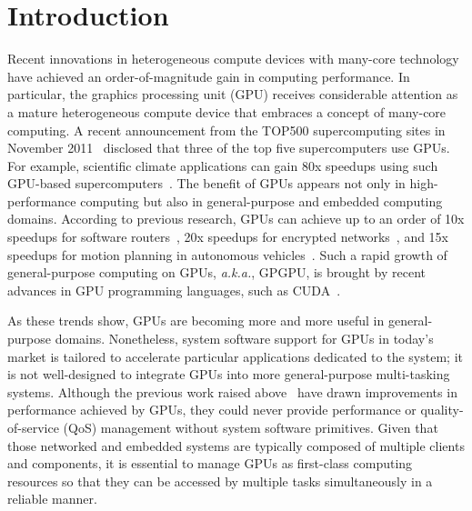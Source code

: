 \vspace{-0.25em}
\section{Introduction}
\label{sec:introduction}
\vspace{-0.25em}

Recent innovations in heterogeneous compute devices with many-core
technology have achieved an order-of-magnitude gain in computing
performance. 
In particular, the graphics processing unit (GPU) receives considerable
attention as a mature heterogeneous compute device that embraces a
concept of many-core computing.
A recent announcement from the TOP500 supercomputing sites in November
2011~\cite{TOP500} disclosed that three of the top five supercomputers
use GPUs.
For example, scientific climate applications can gain 80x speedups using
such GPU-based supercomputers~\cite{Shimokawabe10}.
The benefit of GPUs appears not only in high-performance computing but
also in general-purpose and embedded computing domains.
According to previous research, GPUs can achieve up to an order of 10x
speedups for software routers~\cite{Han_SIGCOMM10}, 20x speedups for
encrypted networks~\cite{Jang_NSDI11}, and 15x speedups for motion
planning in autonomous vehicles~\cite{McNaughton_ICRA11}.
Such a rapid growth of general-purpose computing on GPUs,
\textit{a.k.a.}, GPGPU, is brought by recent advances in GPU
programming languages, such as CUDA~\cite{CUDA40}.

As these trends show, GPUs are becoming more and more useful in
general-purpose domains. 
Nonetheless, system software support for GPUs in today's market is
tailored to accelerate particular applications dedicated to the
system; it is not well-designed to integrate GPUs into more
general-purpose multi-tasking systems.
Although the previous work raised above~\cite{Han_SIGCOMM10,
Jang_NSDI11, McNaughton_ICRA11} have drawn improvements in performance
achieved by GPUs, they could never provide performance or
quality-of-service (QoS) management without system software primitives.
Given that those networked and embedded systems are typically composed
of multiple clients and components, it is essential to manage GPUs as
first-class computing resources so that they can be accessed by multiple
tasks simultaneously in a reliable manner.

